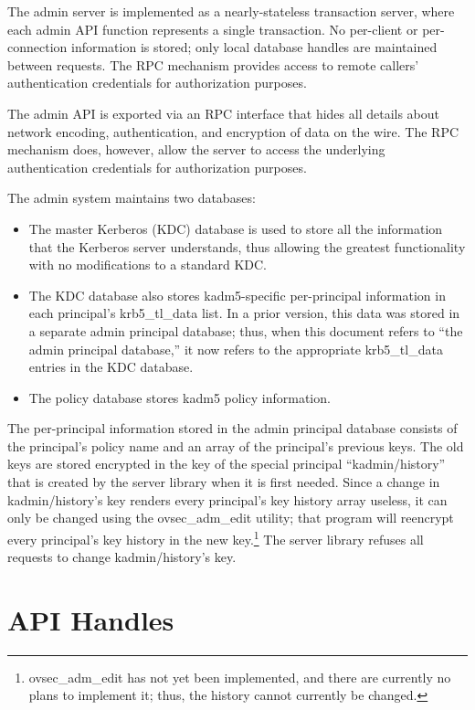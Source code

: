 The admin server is implemented as a nearly-stateless transaction
server, where each admin API function represents a single transaction.
No per-client or per-connection information is stored; only local
database handles are maintained between requests.  The RPC mechanism
provides access to remote callers' authentication credentials for
authorization purposes.

The admin API is exported via an RPC interface that hides all details
about network encoding, authentication, and encryption of data on the
wire.  The RPC mechanism does, however, allow the server to access the
underlying authentication credentials for authorization purposes.

The admin system maintains two databases:
%
\begin{itemize}
\item The master Kerberos (KDC) database is used to store all the
information that the Kerberos server understands, thus allowing the
greatest functionality with no modifications to a standard KDC.  

\item The KDC database also stores kadm5-specific per-principal
information in each principal's krb5_tl_data list.  In a prior
version, this data was stored in a separate admin principal database;
thus, when this document refers to ``the admin principal database,''
it now refers to the appropriate krb5_tl_data entries in the KDC
database.

\item The policy database stores kadm5 policy information.
\end{itemize}

The per-principal information stored in the admin principal database
consists of the principal's policy name and an array of the
principal's previous keys.  The old keys are stored encrypted in the
key of the special principal ``kadmin/history'' that is created by the
server library when it is first needed.  Since a change in
kadmin/history's key renders every principal's key history array
useless, it can only be changed using the ovsec_adm_edit utility; that
program will reencrypt every principal's key history in the new
key.\footnote{ovsec_adm_edit has not yet been implemented, and there
are currently no plans to implement it; thus, the history cannot
currently be changed.}  The server library refuses all requests to
change kadmin/history's key.

\section{API Handles}

